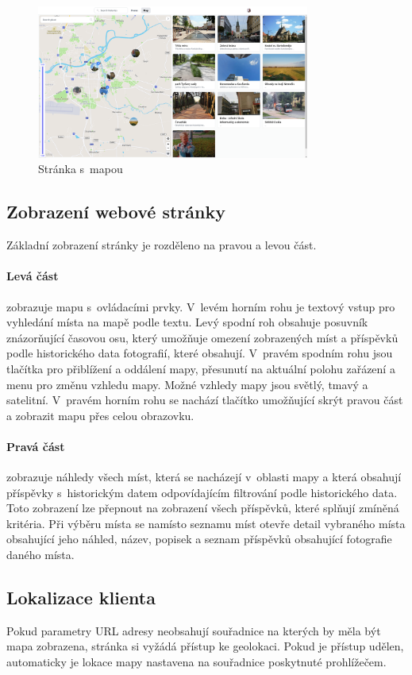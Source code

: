 \documentclass[12pt, a4paper,
  oneside,      %
]{report}
\begin{document}
\begin{figure}[h]
	\centering
	\includegraphics[width=0.8\textwidth]{images/map_page.png}
	\caption{Stránka s~mapou}\label{figure:mapPagePreview}
\end{figure}

\subsection{Zobrazení webové stránky}
Základní zobrazení stránky je rozděleno na pravou a levou část.
\paragraph{Levá část} zobrazuje mapu s~ovládacími prvky. V~levém horním rohu je textový vstup pro vyhledání místa na mapě podle textu. Levý spodní roh obsahuje posuvník znázorňující časovou osu, který umožňuje omezení zobrazených míst a příspěvků podle historického data fotografií, které obsahují. V~pravém spodním rohu jsou tlačítka pro přiblížení a oddálení mapy, přesunutí na aktuální polohu zařázení a menu pro změnu vzhledu mapy. Možné vzhledy mapy jsou světlý, tmavý a satelitní. V~pravém horním rohu se nachází tlačítko umožňující skrýt pravou část a zobrazit mapu přes celou obrazovku.
\paragraph{Pravá část} zobrazuje náhledy všech míst, která se nacházejí v~oblasti mapy a která obsahují příspěvky s~historickým datem odpovídajícím filtrování podle historického data. Toto zobrazení lze přepnout na zobrazení všech příspěvků, které splňují zmíněná kritéria. Při výběru místa se namísto seznamu míst otevře detail vybraného místa obsahující jeho náhled, název, popisek a seznam příspěvků obsahující fotografie daného místa.
\subsection{Lokalizace klienta} Pokud parametry URL adresy neobsahují souřadnice na kterých by měla být mapa zobrazena, stránka si vyžádá přístup ke geolokaci. Pokud je přístup udělen, automaticky je lokace mapy nastavena na souřadnice poskytnuté prohlížečem.
\end{document}
